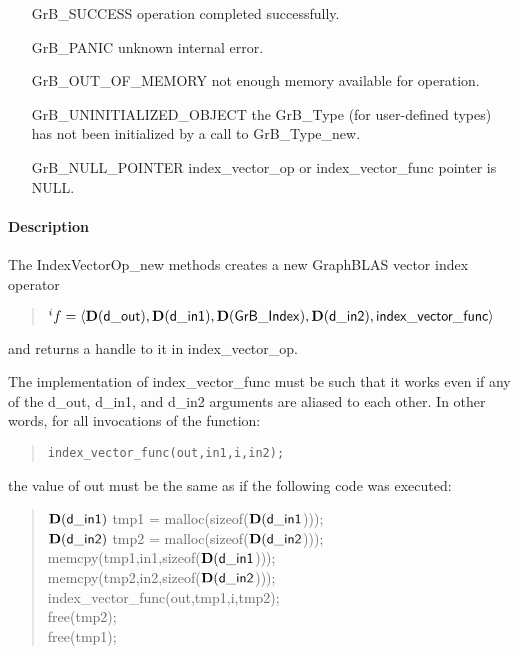 \begin{itemize}[leftmargin=2.1in]
\item[{\sf GrB\_SUCCESS}]           operation completed successfully.
\item[{\sf GrB\_PANIC}]             unknown internal error.
\item[{\sf GrB\_OUT\_OF\_MEMORY}]          not enough memory available for operation.
\item[{\sf GrB\_UNINITIALIZED\_OBJECT}]          the {\sf GrB\_Type} (for user-defined types)
                                    has not been initialized by a call to {\sf GrB\_Type\_new}.
\item[{\sf GrB\_NULL\_POINTER}]    {\sf index\_vector\_op} or {\sf index\_vector\_func} pointer is {\sf NULL}.

\end{itemize}

\paragraph{Description}

The {\sf IndexVectorOp\_new} methods creates a new GraphBLAS vector index operator
\begin{quote}
$^{i}f = \langle \mathbf{D}({\sf d\_out}), \mathbf{D}({\sf d\_in1}), \mathbf{D}({\sf GrB\_Index}), \mathbf{D}({\sf d\_in2}), {\sf index\_vector\_func} \rangle$
\end{quote}
and returns a handle to it in {\sf index\_vector\_op}.

The implementation of {\sf index\_vector\_func} must be such that it works
even if any of the {\sf d\_out}, {\sf d\_in1}, and {\sf d\_in2} arguments are aliased to each other.
In other words, for all invocations of the function:
\begin{quote}
\begin{verbatim}
index_vector_func(out,in1,i,in2);
\end{verbatim}
\end{quote}
the value of {\sf out} must be the same as if the following code
was executed:

\begin{quote}
\begin{code}
    $\mathbf{D}({\sf d\_in1})$ tmp1 = malloc(sizeof($\mathbf{D}({\sf d\_in1}$))); \\
    $\mathbf{D}({\sf d\_in2})$ tmp2 = malloc(sizeof($\mathbf{D}({\sf d\_in2}$))); \\
    memcpy(tmp1,in1,sizeof($\mathbf{D}({\sf d\_in1}$))); \\
    memcpy(tmp2,in2,sizeof($\mathbf{D}({\sf d\_in2}$))); \\
    index\_vector\_func(out,tmp1,i,tmp2); \\
    free(tmp2); \\
    free(tmp1);
\end{code}
\end{quote}

